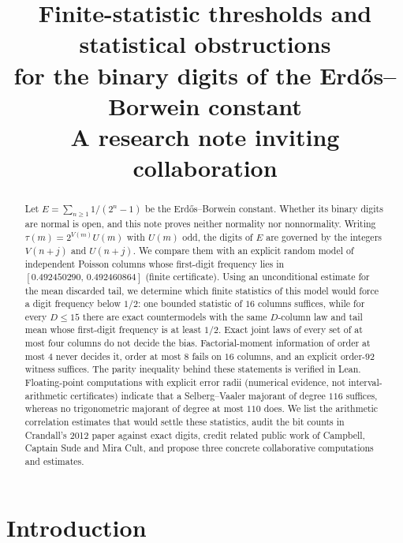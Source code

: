 \documentclass[11pt]{article}
\title{Finite-statistic thresholds and statistical obstructions\\
for the binary digits of the Erd\H{o}s--Borwein constant\\[2pt]
\large A research note inviting collaboration}
\author{}
\date{}
\begin{document}
\maketitle
\vspace{-2.2em}
\begin{center}
\end{center}

\begin{abstract}
Let $E=\sum_{n\ge1}1/(2^n-1)$ be the Erd\H{o}s--Borwein constant. Whether its binary digits are normal is open, and this note proves neither normality nor nonnormality. Writing $\tau(m)=2^{V(m)}U(m)$ with $U(m)$ odd, the digits of $E$ are governed by the integers $V(n+j)$ and $U(n+j)$. We compare them with an explicit random model of independent Poisson columns whose first-digit frequency lies in $[0.492450290,\,0.492460864]$ (finite certificate). Using an unconditional estimate for the mean discarded tail, we determine which finite statistics of this model would force a digit frequency below $1/2$: one bounded statistic of $16$ columns suffices, while for every $D\le15$ there are exact countermodels with the same $D$-column law and tail mean whose first-digit frequency is at least $1/2$. Exact joint laws of every set of at most four columns do not decide the bias. Factorial-moment information of order at most $4$ never decides it, order at most $8$ fails on $16$ columns, and an explicit order-$92$ witness suffices. The parity inequality behind these statements is verified in Lean. Floating-point computations with explicit error radii (numerical evidence, not interval-arithmetic certificates) indicate that a Selberg--Vaaler majorant of degree $116$ suffices, whereas no trigonometric majorant of degree at most $110$ does. We list the arithmetic correlation estimates that would settle these statistics, audit the bit counts in Crandall's 2012 paper against exact digits, credit related public work of Campbell, Captain Sude and Mira Cult, and propose three concrete collaborative computations and estimates.
\end{abstract}

\section{Introduction}\label{sec:intro}
\end{document}
